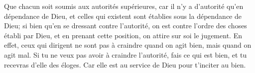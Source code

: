 Que chacun soit soumis aux autorités supérieures,
	car il n’y a d’autorité qu’en dépendance de Dieu,
	et celles qui existent sont établies sous la dépendance de Dieu;
	si bien qu’en se dressant contre l’autorité,
	on est contre l’ordre des choses établi par Dieu,
	et en prenant cette position, on attire sur soi le jugement.
En effet, ceux qui dirigent ne sont pas à craindre quand on agit bien,
	mais quand on agit mal.
Si tu ne veux pas avoir à craindre l’autorité,
	fais ce qui est bien, et tu recevras d’elle des éloges.
	Car elle est au service de Dieu pour t’inciter au bien.

